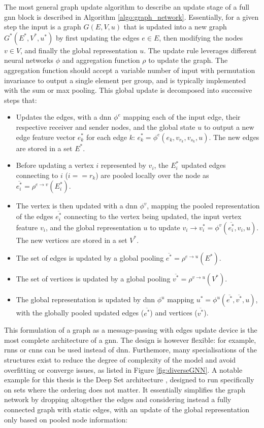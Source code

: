 The most general graph update algorithm to describe an update stage of a full \gls{gnn} block is described in Algorithm \ref{algo:graph_network}. Essentially, for a given step the input is a graph $G(E, V, u)$ that is updated into a new graph $G^*(E^*, V^*, u^*)$ by first updating the edges $e \in E$, then modifying the nodes $v \in V$, and finally the global representation $u$. The update rule leverages different neural networks $\phi$ and aggregation function $\rho$ to update the graph. The aggregation function should accept a variable number of input with permutation invariance to output a single element per group, and is typically implemented with the sum or max pooling. This global update is decomposed into successive steps that: 
\begin{itemize}
    \item Updates the edges, with a \gls{dnn} $\phi^e$ mapping each of the input edge, their respective receiver and sender nodes, and the global state $u$ to output a new edge feature vector $e^*_k$ for each edge $k$: $e^*_k = \phi^e(e_k, v_{r_k}, v_{s_k}, u)$. The new edges are stored in a set $E^*$. 
    \item Before updating a vertex $i$ represented by $v_i$, the $E_i^*$ updated edges connecting to $i$ ($i == r_k$) are pooled locally over the node as $\overline{e^*_i} = \rho^{e \rightarrow v}(E_i^*)$.
    \item The vertex is then updated with a \gls{dnn} $\phi^v$, mapping the pooled representation of the edges $\overline{e^*_i}$ connecting to the vertex being updated, the input vertex feature $v_i$, and the global representation $u$ to update $v_i \rightarrow v^*_i = \phi^v(\overline{e^*_i}, v_i, u)$. The new vertices are stored in a set $V^*$.
    \item The set of edges is updated by a global pooling $\overline{e^*} = \rho^{e \rightarrow u}(E^*)$.
    \item The set of vertices is updated by a global pooling $\overline{v^*} = \rho^{v \rightarrow u}(V^*)$.
    \item The global representation is updated by \gls{dnn} $\phi^u$ mapping $u^* = \phi^u(\overline{e^*}, \overline{v^*}, u)$, with the globally pooled updated edges ($\overline{e^*}$) and vertices ($\overline{v^*}$). 
\end{itemize} 
This formulation of a graph as a message-passing with edges update device is the most complete architecture of a \gls{gnn}. The design is however flexible: for example, \gls{rnn}s or \gls{cnn}s can be used instead of \gls{dnn}. Furthemore, many specialisations of the structures exist to reduce the degree of complexity of the model and avoid overfitting or converge issues, as listed in Figure \ref{fig:diverseGNN}. A notable example for this thesis is the Deep Set architecture \cite{NIPS2017f22e4747}, designed to run specifically on sets where the ordering does not matter. It essentially simplifies the graph network by dropping altogether the edges and considering instead a fully connected graph with static edges, with an update of the global representation only based on pooled node information: 
